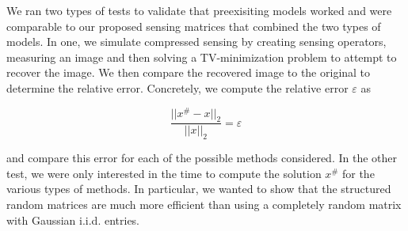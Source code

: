 We ran two types of tests to validate that preexisiting models worked and were
comparable to our proposed sensing matrices that combined the two types of
models. In one, we simulate compressed sensing by creating sensing operators,
measuring an image and then solving a TV-minimization problem to attempt to
recover the image. We then compare the recovered image to the original to
determine the relative error. Concretely, we compute the relative error
$\varepsilon$ as

\begin{equation}
	\frac{||x^{\#} - x||_2}{||x||_2} = \varepsilon
\end{equation}

and compare this error for each of the possible methods considered. In the other
test, we were only interested in the time to compute the solution $x^{\#}$ for
the various types of methods. In particular, we wanted to show that the
structured random matrices are much more efficient than using a completely
random matrix with Gaussian i.i.d. entries. 


